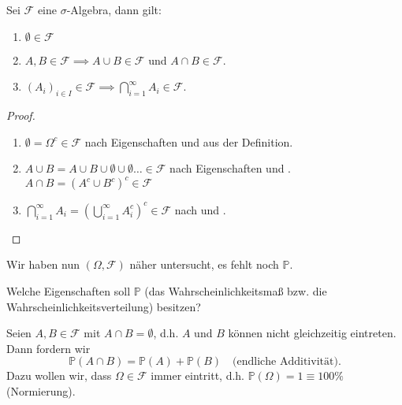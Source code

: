 \begin{lemma}\label{lm:weitere-eigenschaften-einer-sigma-algebra}
    Sei $\mathcal{F}$ eine $\sigma$-Algebra, dann gilt:
    \begin{enumerate}[label=\protect\circled{\alph*}]
        \item $\emptyset\in \mathcal{F}$
        \item $A,B \in \mathcal{F} \implies A \cup B \in \mathcal{F}$ und $A\cap B \in \mathcal{F}$.
        \item $(A_i)_{i \in I}\in \mathcal{F} \implies \bigcap_{i=1}^{\infty}A_i \in \mathcal{F}$.
    \end{enumerate}
\end{lemma}
\begin{proof}
    \begin{enumerate}[label=\protect\circled{\alph*}]
        \item $\emptyset = \Omega^{c} \in \mathcal{F}$ nach Eigenschaften  und  aus der Definition.
        \item $A \cup B = A \cup B \cup \emptyset \cup \emptyset \ldots \in \mathcal{F}$ nach Eigenschaften   und . $A \cap B = (A^{c}\cup B ^{c})^{c} \in \mathcal{F}$
        \item $\bigcap_{i=1}^{\infty}A_i = \left( \bigcup_{i=1}^{\infty}A_i^{c} \right) ^{c}\in \mathcal{F}$ nach  und .
    \end{enumerate}
\end{proof}

Wir haben nun $(\Omega, \mathcal{F})$ näher untersucht, es fehlt noch $\mathbb{P}$. 
\begin{question}
    Welche Eigenschaften soll $\mathbb{P}$ (das Wahrscheinlichkeitsmaß bzw. die Wahrscheinlichkeitsverteilung) besitzen?
\end{question}
Seien $A,B \in \mathcal{F}$ mit $A\cap B = \emptyset$, d.h. $A$ und $B$ können nicht gleichzeitig eintreten. Dann fordern wir
\[
    \mathbb{P}(A \cap B) = \mathbb{P}(A) + \mathbb{P}(B) \quad \text{(endliche Additivität)}
.\] 
Dazu wollen wir, dass $\Omega \in \mathcal{F}$ immer eintritt, d.h. $\mathbb{P}(\Omega) = 1 \equiv  100\%$ (Normierung).

